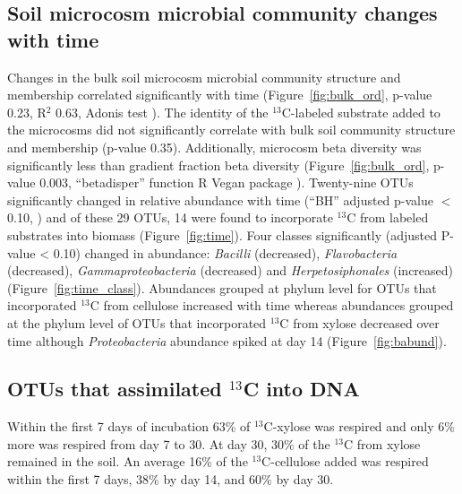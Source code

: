 \subsection{Soil microcosm microbial community changes with time}
Changes in the bulk soil microcosm microbial community structure and membership
correlated significantly with time (Figure~\ref{fig:bulk_ord},
p-value 0.23, R$^{2}$ 0.63, Adonis test \citep{Anderson2001a}). The identity of
the $^{13}$C-labeled substrate added to the microcosms did not significantly
correlate with bulk soil community structure and membership (p-value 0.35).
Additionally, microcosm beta diversity was significantly less than gradient
fraction beta diversity (Figure~\ref{fig:bulk_ord}, p-value 0.003,
``betadisper'' function R Vegan package \citep{Anderson2006,oksanen2007vegan}).
Twenty-nine OTUs significantly changed in relative abundance with time (``BH''
adjusted p-value $<$0.10, \citep{YBenjamini1995}) and of these 29 OTUs, 14 were
found to incorporate $^{13}$C from labeled substrates into biomass
(Figure~\ref{fig:time}). Four classes significantly (adjusted P-value < 0.10)
changed in abundance: \textit{Bacilli} (decreased), \textit{Flavobacteria}
(decreased), \textit{Gammaproteobacteria} (decreased) and
\textit{Herpetosiphonales} (increased) (Figure~\ref{fig:time_class}).
Abundances grouped at phylum level for OTUs that incorporated $^{13}$C from
cellulose  increased with time whereas abundances grouped at the phylum level
of OTUs that incorporated $^{13}$C from xylose decreased over time although
\textit{Proteobacteria} abundance spiked at day 14 (Figure~\ref{fig:babund}).

\subsection{OTUs that assimilated $^{13}$C into DNA} \label{responders}
Within the first 7 days of incubation 63\% of $^{13}$C-xylose was
respired and only 6\% more was respired from day 7 to 30. At day 30, 30\% of
the $^{13}$C from xylose remained in the soil. An average 16\% of the
$^{13}$C-cellulose added was respired within the first 7 days, 38\% by day 14,
and 60\% by day 30.   

